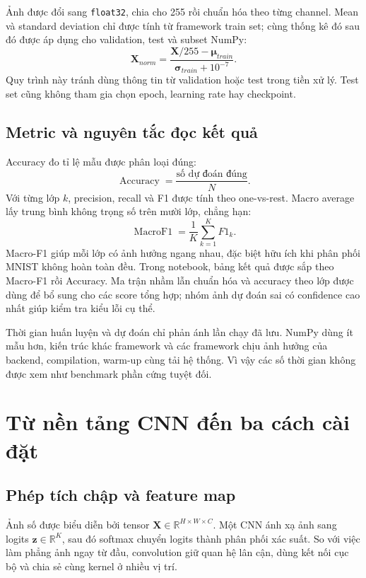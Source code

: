 \documentclass[12pt,a4paper]{report}
\begin{document}
Ảnh được đổi sang \texttt{float32}, chia cho 255 rồi chuẩn hóa theo từng channel.
Mean và standard deviation chỉ được tính từ framework train set; cùng thống kê
đó sau đó được áp dụng cho validation, test và subset NumPy:
\begin{equation}
    \mathbf{X}_{norm}=
    \frac{\mathbf{X}/255-\boldsymbol{\mu}_{train}}
    {\boldsymbol{\sigma}_{train}+10^{-7}}.
\end{equation}
Quy trình này tránh dùng thông tin từ validation hoặc test trong tiền xử lý.
Test set cũng không tham gia chọn epoch, learning rate hay checkpoint.

\section{Metric và nguyên tắc đọc kết quả}
Accuracy đo tỉ lệ mẫu được phân loại đúng:
\begin{equation}
    \operatorname{Accuracy}=\frac{\text{số dự đoán đúng}}{N}.
\end{equation}
Với từng lớp $k$, precision, recall và F1 được tính theo one-vs-rest. Macro
average lấy trung bình không trọng số trên mười lớp, chẳng hạn:
\begin{equation}
    \operatorname{MacroF1}=\frac{1}{K}\sum_{k=1}^{K}F1_k.
\end{equation}
Macro-F1 giúp mỗi lớp có ảnh hưởng ngang nhau, đặc biệt hữu ích khi phân phối
MNIST không hoàn toàn đều. Trong notebook, bảng kết quả được sắp theo Macro-F1
rồi Accuracy. Ma trận nhầm lẫn chuẩn hóa và accuracy theo lớp được dùng để bổ
sung cho các score tổng hợp; nhóm ảnh dự đoán sai có confidence cao nhất giúp
kiểm tra kiểu lỗi cụ thể.

Thời gian huấn luyện và dự đoán chỉ phản ánh lần chạy đã lưu. NumPy dùng ít mẫu
hơn, kiến trúc khác framework và các framework chịu ảnh hưởng của backend,
compilation, warm-up cùng tải hệ thống. Vì vậy các số thời gian không được xem
như benchmark phần cứng tuyệt đối.

\chapter{Từ nền tảng CNN đến ba cách cài đặt}

\section{Phép tích chập và feature map}
Ảnh số được biểu diễn bởi tensor
$\mathbf{X}\in\mathbb{R}^{H\times W\times C}$. Một CNN ánh xạ ảnh sang logits
$\mathbf{z}\in\mathbb{R}^{K}$, sau đó softmax chuyển logits thành phân phối xác
suất. So với việc làm phẳng ảnh ngay từ đầu, convolution giữ quan hệ lân cận,
dùng kết nối cục bộ và chia sẻ cùng kernel ở nhiều vị trí.
\end{document}
